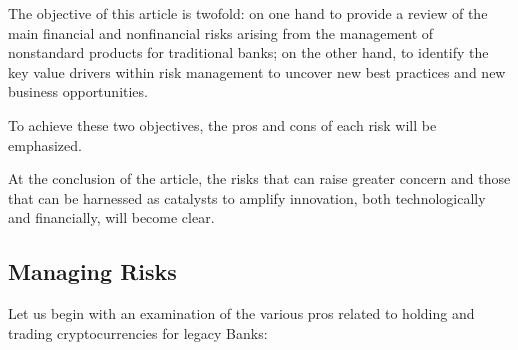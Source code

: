 \documentclass[letterpaper,10pt,english]{jupyterBook}
\begin{document}
\sphinxAtStartPar
The objective of this article is twofold: on one hand to provide a review of the main financial and non\sphinxhyphen{}financial risks arising from the management of non\sphinxhyphen{}standard products for traditional banks; on the other hand, to identify the key value drivers within risk management to uncover new best practices and new business opportunities.

\sphinxAtStartPar
To achieve these two objectives, the pros and cons of each risk will be emphasized.

\sphinxAtStartPar
At the conclusion of the article, the risks that can raise greater concern and those that can be harnessed as catalysts to amplify innovation, both technologically and financially, will become clear.


\subsection{Managing Risks}
\label{\detokenize{ARM/arm:managing-risks}}
\sphinxAtStartPar
Let us begin with an examination of the various pros related to holding and trading cryptocurrencies for legacy Banks:
\end{document}
